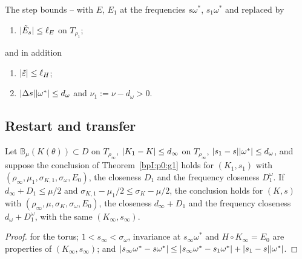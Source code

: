 \begin{definition}\label{bpI:p2s2hc:bounds}
The step bounds -- with $E$, $E_1$ at the frequencies $s\omega^*$, $s_1\omega^*$ and  replaced by
\begin{enumerate}[label=(S\arabic*$'$),start=5]
\item\label{bpI:p2s2hc:S5} $\lvert \tilde E_s\rvert\le\ell_E$ on $T_{\rho_1}$;
\end{enumerate}
and in addition
\begin{enumerate}[label=(S\arabic*),start=8]
\item\label{bpI:p2s2hc:S8} $\lvert \tilde\varepsilon\rvert\le\ell_H$;
\item\label{bpI:p2s2hc:S9} $\lvert \Delta s\rvert\lvert \omega^*\rvert\le d_\omega$ and $\nu_1:=\nu-d_\omega>0$.
\end{enumerate}
\end{definition}

\subsection{Restart and transfer}\label{bpI:p2s2hc:sec-transfer}

\begin{proposition}\label{bpI:p2s2hc:restart}
Let $\mathbb B_\mu(K(\theta))\subset D$ on $T_{\rho_\infty}$, $\lvert K_1-K\rvert\le d_\infty$ on $T_{\rho_\infty}$, $\lvert s_1-s\rvert\lvert \omega^*\rvert\le d_\omega$, and suppose the conclusion of
Theorem~\ref{bpI:p0:g1} holds for $(K_1,s_1)$ with $(\rho_\infty,\mu_1,\sigma_{K,1},\sigma_\omega,E_0)$, the closeness $D_1$ and the frequency closeness $D_1^\omega$. If
$d_\infty+D_1\le\mu/2$ and $\sigma_{K,1}-\mu_1/2\le\sigma_K-\mu/2$, the conclusion holds for $(K,s)$ with $(\rho_\infty,\mu,\sigma_K,\sigma_\omega,E_0)$, the closeness $d_\infty+D_1$
and the frequency closeness $d_\omega+D_1^\omega$, with the same $(K_\infty,s_\infty)$.
\end{proposition}

\begin{proof}
\label{stepI:p2s2hc:rs}
 for the torus; $1<s_\infty<\sigma_\omega$, invariance at $s_\infty\omega^*$ and $H\circ K_\infty=E_0$ are properties of $(K_\infty,s_\infty)$; and
$\lvert s_\infty\omega^*-s\omega^*\rvert\le\lvert s_\infty\omega^*-s_1\omega^*\rvert+\lvert s_1-s\rvert\lvert \omega^*\rvert$.
\end{proof}

